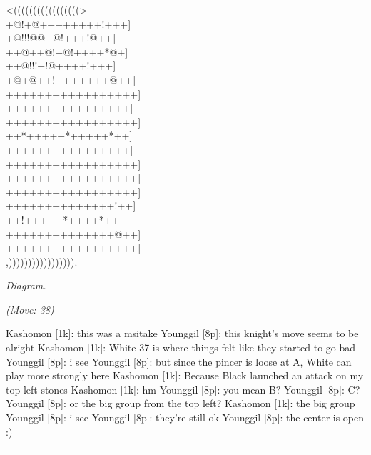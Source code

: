 \documentclass[letterpaper,12pt]{memoir}
\newcounter{GoFigure}[part]
\newcommand{\gofigure}{%
 \stepcounter{GoFigure}
 \centerline{\textit{Diagram.\thinspace\arabic{GoFigure}}}
}
\newcommand{\subtext}[1]{\centerline{\textit{#1}}}
\begin{document}
\begin{minipage}[t]{0.5\textwidth}
{\gnos
<(((((((((((((((((>\\
+@!+@++++++++!+++]\\
+@!!!@@+@!+++!@++]\\
++@++@!+@!++++*@+]\\
++@!!!+!@++++!+++]\\
+@+@++!+++++++@++]\\
+++++++++++++++++]\\
++++++++++++++++]\\
+++++++++++++++++]\\
++*+++++*+++++*++]\\
++++++++++++++++]\\
+++++++++++++++++]\\
+++++++++++++++++]\\
+++++++++++++++++]\\
++++++++++++++!++]\\
++!+++++*++++*++]\\
++++++++++++++@++]\\
+++++++++++++++++]\\
,))))))))))))))))).\\
}
\gofigure

\subtext{(Move: 38)}
\end{minipage}
\begin{minipage}[t]{0.5\textwidth}
\setlength{\parskip}{0.5em}
Kashomon [1k]: this was a msitake
Younggil [8p]: this knight's move seems to be alright
Kashomon [1k]: White 37 is where things felt like they started to go bad
Younggil [8p]: i see
Younggil [8p]: but since the pincer is loose at A, White can play more strongly here
Kashomon [1k]: Because Black launched an attack on my top left stones
Kashomon [1k]: hm
Younggil [8p]: you mean B?
Younggil [8p]: C?
Younggil [8p]: or the big group from the top left?
Kashomon [1k]: the big group
Younggil [8p]: i see
Younggil [8p]: they're still ok
Younggil [8p]: the center is open :)


\end{minipage}
\vfill

\rule{\textwidth}{0.5pt}
\end{document}

